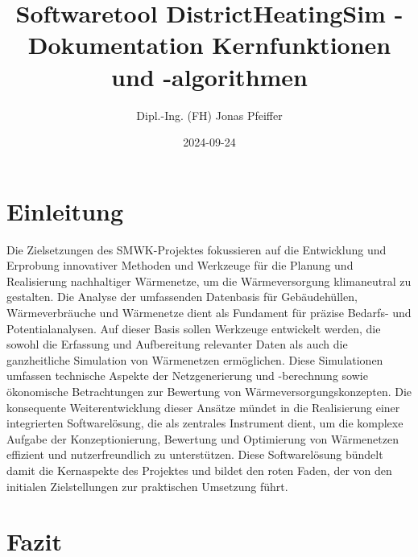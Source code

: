 \documentclass[a4paper,12pt]{article}
\title{Softwaretool DistrictHeatingSim - Dokumentation Kernfunktionen und -algorithmen}
\author{Dipl.-Ing. (FH) Jonas Pfeiffer}
\date{2024-09-24}
\begin{document}
\maketitle

\tableofcontents

\section{Einleitung}
Die Zielsetzungen des SMWK-Projektes fokussieren auf die Entwicklung und Erprobung innovativer Methoden und Werkzeuge für die Planung und Realisierung nachhaltiger Wärmenetze, um die Wärmeversorgung klimaneutral zu gestalten. Die Analyse der umfassenden Datenbasis für Gebäudehüllen, Wärmeverbräuche und Wärmenetze dient als Fundament für präzise Bedarfs- und Potentialanalysen. Auf dieser Basis sollen Werkzeuge entwickelt werden, die sowohl die Erfassung und Aufbereitung relevanter Daten als auch die ganzheitliche Simulation von Wärmenetzen ermöglichen. Diese Simulationen umfassen technische Aspekte der Netzgenerierung und -berechnung sowie ökonomische Betrachtungen zur Bewertung von Wärmeversorgungskonzepten. Die konsequente Weiterentwicklung dieser Ansätze mündet in die Realisierung einer integrierten Softwarelösung, die als zentrales Instrument dient, um die komplexe Aufgabe der Konzeptionierung, Bewertung und Optimierung von Wärmenetzen effizient und nutzerfreundlich zu unterstützen. Diese Softwarelösung bündelt damit die Kernaspekte des Projektes und bildet den roten Faden, der von den initialen Zielstellungen zur praktischen Umsetzung führt.




























\section{Fazit}
\end{document}
